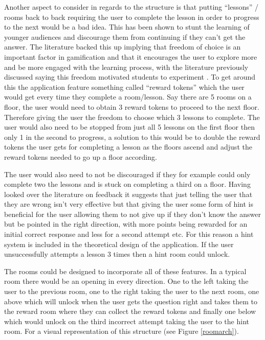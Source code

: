 \documentclass[12pt,a4paper]{article}
\begin{document}
Another aspect to consider in regards to the structure is that putting “lessons” / rooms back to back requiring the user to complete the lesson in order to progress to the next would be a bad idea. This has been shown to stunt the learning of younger audiences and discourage them from continuing if they can’t get the answer. The literature backed this up implying that freedom of choice is an important factor in gamification and that it encourages the user to explore more and be more engaged with the learning process, with the literature previously discussed saying this freedom motivated students to experiment \cite{eagle2004capture2}. To get around this the application feature something called “reward tokens” which the user would get every time they complete a room/lesson. Say there are 5 rooms on a floor, the user would need to obtain 3 reward tokens to proceed to the next floor. Therefore giving the user the freedom to choose which 3 lessons to complete. The user would also need to be stopped from just all 5 lessons on the first floor then only 1 in the second to progress, a solution to this would be to double the reward tokens the user gets for completing a lesson as the floors ascend and adjust the reward tokens needed to go up a floor according. 



The user would also need to not be discouraged if they for example could only complete two the lessons and is stuck on completing a third on a floor. Having looked over the literature on feedback it suggests that just telling the user that they are wrong isn’t very effective but that giving the user some form of hint is beneficial for the user \cite{attali2015effects2} allowing them to not give up if they don’t know the answer but be pointed in the right direction, with more points being rewarded for an initial correct response and less for a second attempt etc. For this reason a hint system is included in the theoretical design of the application.  If the user unsuccessfully attempts a lesson 3 times then a hint room could unlock. 

The rooms could be designed to incorporate all of these features. In a typical room there would be an opening in every direction. One to the left taking the user to the previous room, one to the right taking the user to the next room, one above which will unlock when the user gets the question right and takes them to the reward room where they can collect the reward tokens and finally one below which would unlock on the third incorrect attempt taking the user to the hint room. For a visual representation of this structure  (see Figure \ref{roomarch}). 
\end{document}
